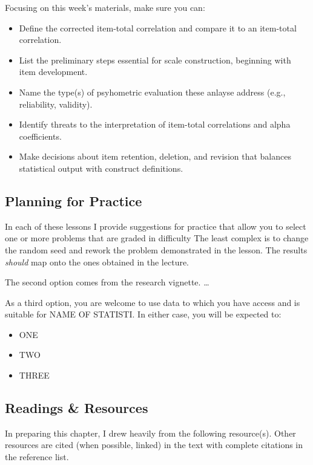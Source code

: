 \documentclass[
  english,
]{book}
\providecommand{\tightlist}{%
  \setlength{\itemsep}{0pt}\setlength{\parskip}{0pt}}
\begin{document}
Focusing on this week's materials, make sure you can:

\begin{itemize}
\tightlist
\item
  Define the corrected item-total correlation and compare it to an item-total correlation.
\item
  List the preliminary steps essential for scale construction, beginning with item development.
\item
  Name the type(s) of psyhometric evaluation these anlayse address (e.g., reliability, validity).
\item
  Identify threats to the interpretation of item-total correlations and alpha coefficients.
\item
  Make decisions about item retention, deletion, and revision that balances statistical output with construct definitions.
\end{itemize}

\hypertarget{planning-for-practice-5}{%
\subsection{Planning for Practice}\label{planning-for-practice-5}}

In each of these lessons I provide suggestions for practice that allow you to select one or more problems that are graded in difficulty The least complex is to change the random seed and rework the problem demonstrated in the lesson. The results \emph{should} map onto the ones obtained in the lecture.

The second option comes from the research vignette. \ldots{}

As a third option, you are welcome to use data to which you have access and is suitable for NAME OF STATISTI. In either case, you will be expected to:

\begin{itemize}
\tightlist
\item
  ONE
\item
  TWO
\item
  THREE
\end{itemize}

\hypertarget{readings-resources-5}{%
\subsection{Readings \& Resources}\label{readings-resources-5}}

In preparing this chapter, I drew heavily from the following resource(s). Other resources are cited (when possible, linked) in the text with complete citations in the reference list.
\end{document}
